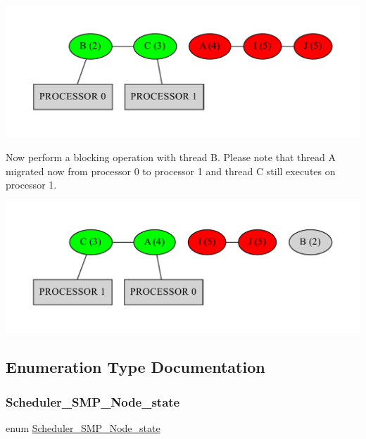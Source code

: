 \begin{DoxyImageNoCaption}
  \mbox{\includegraphics[width=\textwidth,height=\textheight/2,keepaspectratio=true]{dot_inline_dotgraph_9}}
\end{DoxyImageNoCaption}


Now perform a blocking operation with thread B. Please note that thread A migrated now from processor 0 to processor 1 and thread C still executes on processor 1.


\begin{DoxyImageNoCaption}
  \mbox{\includegraphics[width=\textwidth,height=\textheight/2,keepaspectratio=true]{dot_inline_dotgraph_10}}
\end{DoxyImageNoCaption}
 

\subsection{Enumeration Type Documentation}
\mbox{\label{group__RTEMSScoreSchedulerSMP_gae8abff79029e8e3da109701348c4eccd}} 
\subsubsection{\texorpdfstring{Scheduler\_SMP\_Node\_state}{Scheduler\_SMP\_Node\_state}}
{\footnotesize\ttfamily enum \mbox{\hyperlink{group__RTEMSScoreSchedulerSMP_gae8abff79029e8e3da109701348c4eccd}{Scheduler\+\_\+\+S\+M\+P\+\_\+\+Node\+\_\+state}}}



